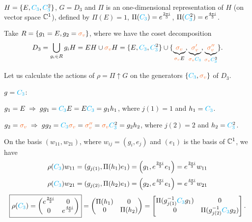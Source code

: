 \begin{example} \label{ex:induced_rep_C3D3}
$H = \{E, \Ct, \Ctn{2}\}$, $G = D_3$ and $\Pi$ is an one-dimensional representation of $H$ (on vector space ${\mathbb{C}}^1$), defined by $\Pi(E) = 1$, $\Pi(\Ct) = e^{\frac{2\pi i}{3}}$, $\Pi(\Ctn{2}) = e^{\frac{4\pi i}{3}}$.

\n

Take $R = \{g_1 = E, g_2 = \sv\}$, where we have the coset decomposition
\begin{equation} \label{eq:coset_decomp_of_D3_subgroup_C3}
D_3 = \bigcup_{g_i \in R} g_i H =
E H \cup \sv H = \{E, \Ct, \Ctn{2}\} \cup \{\underbrace{\sv}_{\sv E}, \underbrace{\svp}_{\sv \Ct}, \underbrace{\svpp}_{\sv \Ctn{2}}\}.
\end{equation}

Let us calculate the actions of $\rho = \Pi \uparrow G$ on the generators $\{\Ct, \sv\}$ of $D_3$.

$g = \Ct$:

$g_1 = E \implies g g_1 = \Ct E = E \Ct = g_1 h_1$, where $j(1) = 1$ and $h_1 = \Ct$.

$g_2 = \sv \implies g g_2 = \Ct \sv = \svpp = \sv \Ctn{2} = g_2 h_2$, where $j(2) = 2$ and $h_2 = \Ctn{2}$.

\n

On the basis $(w_{11}, w_{21})$, where $w_{ij} = (g_i, e_j)$ and $(e_1)$ is the basis of ${\mathbb{C}}^1$, we have
\begin{equation} \label{eq:rhoC3_w11_example_inducedrep_C3D3}
\rho(\Ct) w_{11} = (g_{j(1)}, \Pi(h_1) e_1) = \qty(g_1, e^{\frac{2\pi i}{3}} e_1) = e^{\frac{2\pi i}{3}} w_{11}
\end{equation}
\begin{equation} \label{eq:rhoC3_w21_example_inducedrep_C3D3}
\rho(\Ct) w_{21} = (g_{j(2)}, \Pi(h_2) e_1) = \qty(g_2, e^{\frac{4\pi i}{3}} e_1) = e^{\frac{4\pi i}{3}} w_{21}
\end{equation}
\begin{equation} \label{eq:rhoC3_matrix_example_inducedrep_C3D3}
\boxed{ \rho(\Ct) =
\begin{pmatrix}
e^{\frac{2\pi i}{3}} & 0 \\
0 & e^{\frac{4\pi i}{3}}
\end{pmatrix} } =
\begin{pmatrix}
\Pi\qty(h_1) & 0 \\
0 & \Pi(h_2)
\end{pmatrix} =
\begin{bmatrix}
\Pi(g_{j(1)}^{-1} \Ct g_1) & 0 \\
0 & \Pi(g_{j(2)}^{-1} \Ct g_2)
\end{bmatrix}.
\end{equation}


\end{example}
